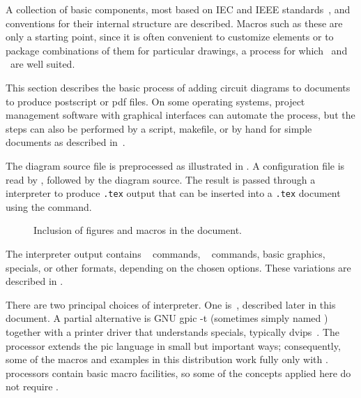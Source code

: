 A collection of basic components, most based on IEC and IEEE
standards~\cite{IECstd,IEEEstd},
and conventions for their internal
structure are described.  Macros such as these are only a starting
point, since it is often convenient to customize elements or to package
combinations of them for particular drawings,
a process for which \Mfour\ and \pic\ are well suited.

This section describes the basic process of adding circuit diagrams to
\latex documents to produce postscript or pdf files.  On some operating
systems, project management software with graphical interfaces can
automate the process, but the steps can also be performed by a script,
makefile, or by hand for simple documents as described in~.

The diagram source file is preprocessed as illustrated in
.  A configuration file is read by \Mfour,
followed by the diagram source.
The result is passed through a
\pic interpreter to produce {\tt .tex} output that can be inserted
into a {\tt .tex} document using the \verb|| command.

\begin{figure}[ht]
 \caption{Inclusion of figures and macros in the \latex document.
 \label{Flowdiag}}
 \end{figure}

\noindent
The interpreter output contains
\TPGF~\cite{tikz} commands,
\PSTricks~\cite{pstricks} commands,
basic \latex graphics, 
\tpic specials, or other formats,
depending on the chosen options.
These variations are described in .

There are two principal choices of \pic interpreter.  One is~\dpic,
described later in this document.  A partial alternative is
GNU {\bq gpic -t} (sometimes simply named \pic)~\cite{gpic}
together with a printer driver
that understands \tpic specials, typically {\bq dvips}~\cite{dvips}.
The \dpic processor extends the pic language in small but important ways;
consequently, some of the macros and examples in this distribution work fully
only with \dpic.
\Pic processors contain basic macro facilities, so some of the
concepts applied here do not require \Mfour.

